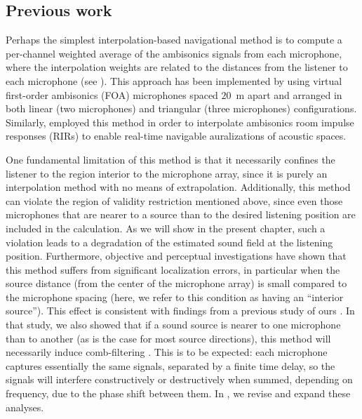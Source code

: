 \subsection{Previous work}
Perhaps the simplest interpolation-based navigational method is to compute a per-channel weighted average of the ambisonics signals from each microphone, where the interpolation weights are related to the distances from the listener to each microphone (see ).
This approach has been implemented by \citet{MarietteKatz2009} using virtual first-order ambisonics (FOA) microphones spaced $20$~m apart and arranged in both linear (two microphones) and triangular (three microphones) configurations.
Similarly, \citet{Southern2009} employed this method in order to interpolate ambisonics room impulse responses (RIRs) to enable real-time navigable auralizations of acoustic spaces.

One fundamental limitation of this method is that it necessarily confines the listener to the region interior to the microphone array, since it is purely an interpolation method with no means of extrapolation.
Additionally, this method can violate the region of validity restriction mentioned above, since even those microphones that are nearer to a source than to the desired listening position are included in the calculation.
As we will show in the present chapter, such a violation leads to a degradation of the estimated sound field at the listening position.
Furthermore, objective and perceptual investigations have shown that this method suffers from significant localization errors, in particular when the source distance (from the center of the microphone array) is small compared to the microphone spacing \citep{MarietteKatz2009,Mariette2010} (here, we refer to this condition as having an ``interior source'').
This effect is consistent with findings from a previous study of ours \citep[Fig.~6]{TylkaChoueiri2016}.
In that study, we also showed that if a sound source is nearer to one microphone than to another (as is the case for most source directions), this method will necessarily induce comb-filtering \citep[Fig.~4a]{TylkaChoueiri2016}.
This is to be expected: each microphone captures essentially the same signals, separated by a finite time delay, so the signals will interfere constructively or destructively when summed, depending on frequency, due to the phase shift between them.
In , we revise and expand these analyses.

